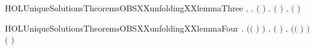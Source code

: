 \newcommand{\HOLUniqueSolutionsTheoremsOBSXXunfoldingXXlemmaTwo}{\UseVerbatim{HOLUniqueSolutionsTheoremsOBSXXunfoldingXXlemmaTwo}}
\begin{SaveVerbatim}{HOLUniqueSolutionsTheoremsOBSXXunfoldingXXlemmaThree}
\HOLTokenTurnstile{} \HOLSymConst{\HOLTokenForall{}} .
         \HOLSymConst{\HOLTokenConj{}}   \HOLSymConst{\HOLTokenImp{}}
       \HOLSymConst{\HOLTokenForall{}}  .
            \ensuremath{(} \ensuremath{)} \HOLTokenTransBegin{}\HOLTokenTransEnd {} \HOLSymConst{\HOLTokenImp{}}
           \HOLSymConst{\HOLTokenExists{}}.   \HOLSymConst{\HOLTokenConj{}} \ensuremath{(} \HOLSymConst{\ensuremath{=}}  \ensuremath{)} \HOLSymConst{\HOLTokenConj{}} \HOLSymConst{\HOLTokenForall{}}.  \ensuremath{(} \ensuremath{)} \HOLTokenTransBegin{}\HOLTokenTransEnd {} 
\end{SaveVerbatim}
\newcommand{\HOLUniqueSolutionsTheoremsOBSXXunfoldingXXlemmaThree}{\UseVerbatim{HOLUniqueSolutionsTheoremsOBSXXunfoldingXXlemmaThree}}
\begin{SaveVerbatim}{HOLUniqueSolutionsTheoremsOBSXXunfoldingXXlemmaFour}
\HOLTokenTurnstile{} \HOLSymConst{\HOLTokenForall{}}     .
         \HOLSymConst{\HOLTokenConj{}}   \HOLSymConst{\HOLTokenConj{}}  \ensuremath{(}\ensuremath{(} \HOLConst{\HOLTokenCompose}   \ensuremath{)} \ensuremath{)}   \HOLSymConst{\HOLTokenConj{}}
         \HOLSymConst{\HOLTokenLeq{}}  \HOLSymConst{\HOLTokenImp{}}
       \HOLSymConst{\HOLTokenExists{}}.
             \HOLSymConst{\HOLTokenConj{}} \ensuremath{(} \HOLSymConst{\ensuremath{=}}  \ensuremath{)} \HOLSymConst{\HOLTokenConj{}}
           \HOLSymConst{\HOLTokenForall{}}.  \ensuremath{(}\ensuremath{(} \HOLConst{\HOLTokenCompose}   \ensuremath{)} \ensuremath{)}  \ensuremath{(} \ensuremath{)}
\end{SaveVerbatim}
